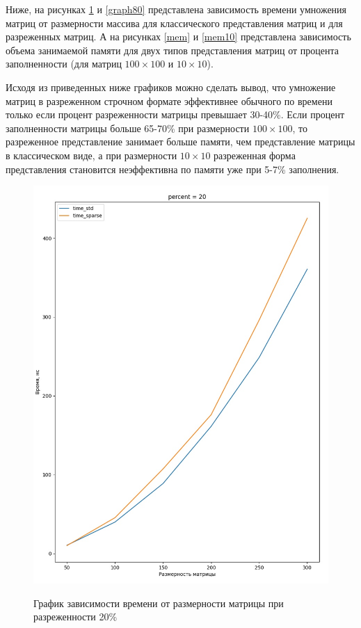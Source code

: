 Ниже, на рисунках \ref{graph20} и \ref{graph80} представлена зависимость времени умножения матриц от размерности массива для классического представления матриц и для разреженных матриц. А на рисунках \ref{mem} и \ref{mem10} представлена зависимость объема занимаемой памяти для двух типов представления матриц от процента заполненности (для матриц $100\times100$ и $10\times10$).

Исходя из приведенных ниже графиков можно сделать вывод, что умножение матриц в разреженном строчном формате эффективнее обычного по времени только если процент разреженности матрицы превышает 30-40\%. Если процент заполненности матрицы больше 65-70\% при размерности $100\times100$, то разреженное представление занимает больше памяти, чем представление матрицы в классическом виде, а при размерности $10\times10$ разреженная форма представления становится неэффективна по памяти уже при 5-7\% заполнения.

\pagebreak

\begin{figure}
	\centering
	\caption{График зависимости времени от размерности матрицы при разреженности 20\%}
	\includegraphics[width=\linewidth]{img/graph20.jpg}
	\label{graph20}
\end{figure}

